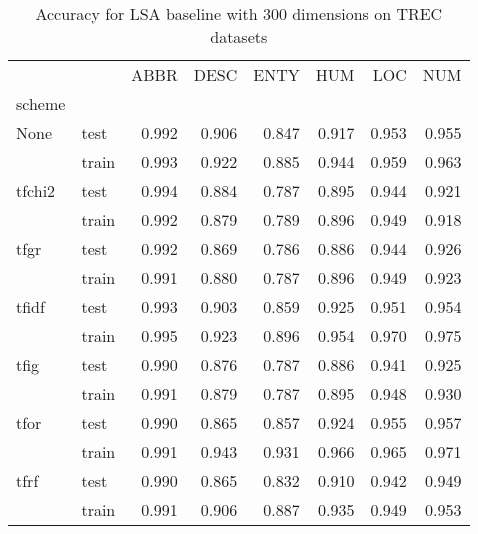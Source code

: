 \begin{table}[H]
\begin{center}

\begin{tabular}{llrrrrrr}
\toprule
{} &  &  ABBR &  DESC &  ENTY &  HUM &  LOC &  NUM \\
scheme &  &       &       &       &      &      &      \\
\midrule
None & test &     0.992 &     0.906 &     0.847 &    0.917 &    0.953 &    0.955 \\
{} & train &     0.993 &     0.922 &     0.885 &    0.944 &    0.959 &    0.963 \\
tfchi2 & test &     0.994 &     0.884 &     0.787 &    0.895 &    0.944 &    0.921 \\
{} & train &     0.992 &     0.879 &     0.789 &    0.896 &    0.949 &    0.918 \\
tfgr & test &     0.992 &     0.869 &     0.786 &    0.886 &    0.944 &    0.926 \\
{} & train &     0.991 &     0.880 &     0.787 &    0.896 &    0.949 &    0.923 \\
tfidf & test &     0.993 &     0.903 &     0.859 &    0.925 &    0.951 &    0.954 \\
{} & train &     0.995 &     0.923 &     0.896 &    0.954 &    0.970 &    0.975 \\
tfig & test &     0.990 &     0.876 &     0.787 &    0.886 &    0.941 &    0.925 \\
{} & train &     0.991 &     0.879 &     0.787 &    0.895 &    0.948 &    0.930 \\
tfor & test &     0.990 &     0.865 &     0.857 &    0.924 &    0.955 &    0.957 \\
{} & train &     0.991 &     0.943 &     0.931 &    0.966 &    0.965 &    0.971 \\
tfrf & test &     0.990 &     0.865 &     0.832 &    0.910 &    0.942 &    0.949 \\
{} & train &     0.991 &     0.906 &     0.887 &    0.935 &    0.949 &    0.953 \\
\bottomrule
\end{tabular}

\caption[Accuracy for LSA baseline with 300 dimensions on TREC datasets]{Accuracy for LSA baseline with 300 dimensions on TREC datasets}
\label{tab:lsa:resuts:abs:300:TREC}
\end{center}
\end{table}





